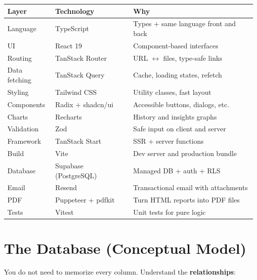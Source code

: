 \documentclass[11pt,a4paper]{article}
\begin{document}
\begin{table}[h]
\centering
\small
\begin{tabular}{@{}lll@{}}
\toprule
Layer & Technology & Why \\
\midrule
Language & TypeScript & Types + same language front and back \\
UI & React 19 & Component-based interfaces \\
Routing & TanStack Router & URL $\leftrightarrow$ files, type-safe links \\
Data fetching & TanStack Query & Cache, loading states, refetch \\
Styling & Tailwind CSS & Utility classes, fast layout \\
Components & Radix + shadcn/ui & Accessible buttons, dialogs, etc. \\
Charts & Recharts & History and insights graphs \\
Validation & Zod & Safe input on client and server \\
Framework & TanStack Start & SSR + server functions \\
Build & Vite & Dev server and production bundle \\
Database & Supabase (PostgreSQL) & Managed DB + auth + RLS \\
Email & Resend & Transactional email with attachments \\
PDF & Puppeteer + pdfkit & Turn HTML reports into PDF files \\
Tests & Vitest & Unit tests for pure logic \\
\bottomrule
\end{tabular}
\end{table}

\section{The Database (Conceptual Model)}

You do not need to memorize every column. Understand the \textbf{relationships}:

\begin{center}
\end{center}
\end{document}
